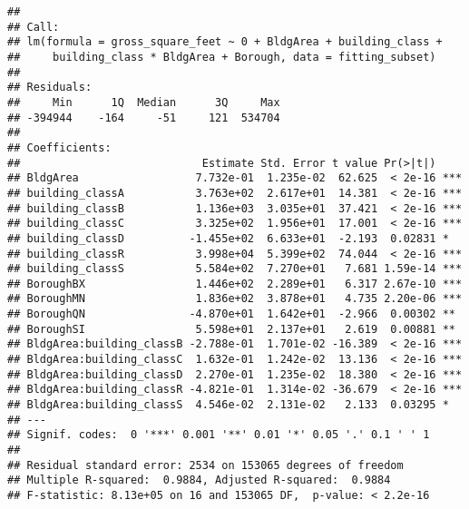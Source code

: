 \documentclass[]{article}
\newenvironment{Shaded}{\begin{snugshade}}{\end{snugshade}}
\newcommand{\CommentTok}[1]{\textcolor[rgb]{0.56,0.35,0.01}{\textit{#1}}}
\newcommand{\DataTypeTok}[1]{\textcolor[rgb]{0.13,0.29,0.53}{#1}}
\newcommand{\DecValTok}[1]{\textcolor[rgb]{0.00,0.00,0.81}{#1}}
\newcommand{\KeywordTok}[1]{\textcolor[rgb]{0.13,0.29,0.53}{\textbf{#1}}}
\newcommand{\NormalTok}[1]{#1}
\newcommand{\OperatorTok}[1]{\textcolor[rgb]{0.81,0.36,0.00}{\textbf{#1}}}
\newcommand{\StringTok}[1]{\textcolor[rgb]{0.31,0.60,0.02}{#1}}
\begin{document}
\begin{verbatim}
## 
## Call:
## lm(formula = gross_square_feet ~ 0 + BldgArea + building_class + 
##     building_class * BldgArea + Borough, data = fitting_subset)
## 
## Residuals:
##     Min      1Q  Median      3Q     Max 
## -394944    -164     -51     121  534704 
## 
## Coefficients:
##                            Estimate Std. Error t value Pr(>|t|)    
## BldgArea                  7.732e-01  1.235e-02  62.625  < 2e-16 ***
## building_classA           3.763e+02  2.617e+01  14.381  < 2e-16 ***
## building_classB           1.136e+03  3.035e+01  37.421  < 2e-16 ***
## building_classC           3.325e+02  1.956e+01  17.001  < 2e-16 ***
## building_classD          -1.455e+02  6.633e+01  -2.193  0.02831 *  
## building_classR           3.998e+04  5.399e+02  74.044  < 2e-16 ***
## building_classS           5.584e+02  7.270e+01   7.681 1.59e-14 ***
## BoroughBX                 1.446e+02  2.289e+01   6.317 2.67e-10 ***
## BoroughMN                 1.836e+02  3.878e+01   4.735 2.20e-06 ***
## BoroughQN                -4.870e+01  1.642e+01  -2.966  0.00302 ** 
## BoroughSI                 5.598e+01  2.137e+01   2.619  0.00881 ** 
## BldgArea:building_classB -2.788e-01  1.701e-02 -16.389  < 2e-16 ***
## BldgArea:building_classC  1.632e-01  1.242e-02  13.136  < 2e-16 ***
## BldgArea:building_classD  2.270e-01  1.235e-02  18.380  < 2e-16 ***
## BldgArea:building_classR -4.821e-01  1.314e-02 -36.679  < 2e-16 ***
## BldgArea:building_classS  4.546e-02  2.131e-02   2.133  0.03295 *  
## ---
## Signif. codes:  0 '***' 0.001 '**' 0.01 '*' 0.05 '.' 0.1 ' ' 1
## 
## Residual standard error: 2534 on 153065 degrees of freedom
## Multiple R-squared:  0.9884, Adjusted R-squared:  0.9884 
## F-statistic: 8.13e+05 on 16 and 153065 DF,  p-value: < 2.2e-16
\end{verbatim}

\begin{Shaded}
\end{Shaded}
\end{document}
